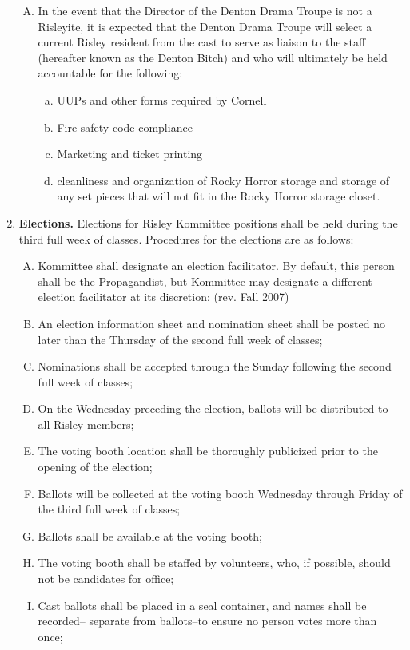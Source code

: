 \documentclass[12pt]{article}
\begin{document}
\begin{enumerate}[1.]
\begin{enumerate}[A.]
\item In the event that the Director of the Denton Drama Troupe is not a Risleyite, it is expected that the Denton Drama Troupe will select a current Risley resident from the cast to serve as liaison to the staff (hereafter known as the Denton Bitch) and who will ultimately be held accountable for the following: 
\begin{enumerate}[a.]
\item UUPs and other forms required by Cornell 
\item Fire safety code compliance 
\item Marketing and ticket printing 
\item cleanliness and organization of Rocky Horror storage and storage of any set pieces that will not fit in the Rocky Horror storage closet.
\end{enumerate}
\end{enumerate}
\item \textbf{Elections.} Elections for Risley Kommittee positions shall be held during the third full week of classes. Procedures for the elections are as follows: 
\begin{enumerate}[A.]
\item Kommittee shall designate an election facilitator. By default, this person shall be the Propagandist, but Kommittee may designate a different election facilitator at its discretion; (rev. Fall 2007)
\item An election information sheet and nomination sheet shall be posted no later than the Thursday of the second full week of classes;
\item Nominations shall be accepted through the Sunday following the second full week of classes; 
\item On the Wednesday preceding the election, ballots will be distributed to all Risley members; 
\item The voting booth location shall be thoroughly publicized prior to the opening of the election; 
\item Ballots will be collected at the voting booth Wednesday through Friday of the third full week of classes; 
\item Ballots shall be available at the voting booth; 
\item The voting booth shall be staffed by volunteers, who, if possible, should not be candidates for office; 
\item Cast ballots shall be placed in a seal container, and names shall be recorded-- separate from ballots--to ensure no person votes more than once; 

\end{enumerate}
\end{enumerate}
\end{document}
